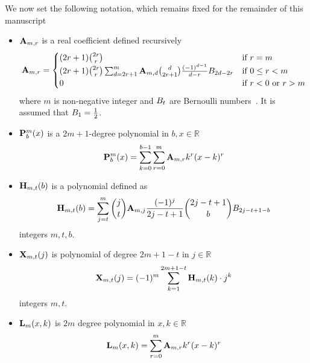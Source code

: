 We now set the following notation, which remains fixed for the remainder of this manuscript
\begin{itemize}
    \setlength\itemsep{1.6em}
    \item ${\mathbf{A}} \sb{m,r}$ is a real coefficient defined recursively
    \begin{equation}
        \label{eq:def_coeff_a}
        {\mathbf{A}} \sb{m,r} =
        \begin{cases}
        (2r+1)
            \binom{2r}{r} & \text{if } r=m \\
            (2r+1) \binom{2r}{r} \sum_{d=2r+1}^{m} {\mathbf{A}} \sb{m,d} \binom{d}{2r+1} \frac{(-1)^{d-1}}{d-r}
            {B}\sb{2d-2r} & \text{if } 0 \leq r<m \\
            0 & \text{if } r<0 \text{ or } r>m
        \end{cases}
    \end{equation}
    where $m$ is non-negative integer and ${B}\sb{t}$ are Bernoulli numbers~\cite{WeissteinBernoulli}.
    It is assumed that ${B}\sb{1}=\frac{1}{2}$.

    \item ${\mathbf{P}}\sp{m} \sb{b}(x)$ is a $2m+1$-degree polynomial in $b,x\in\mathbb{R}$
    \begin{equation}
        \label{eq:def_polynomial_p}
        {\mathbf{P}}\sp{m} \sb{b}(x) = \sum_{k=0}^{b-1} \sum_{r=0}^{m} {\mathbf{A}} \sb{m,r} k^r(x-k)^r
    \end{equation}

    \item ${\mathbf{H}} \sb{m,t} (b)$ is a polynomial defined as
    \begin{equation}
        \label{eq:def_coeff_h}
        {\mathbf{H}} \sb{m,t} (b)
        = \sum_{j=t}^{m} \binom{j}{t} {\mathbf{A}} \sb{m,j} \frac{(-1)^j}{2j-t+1} \binom{2j-t+1}{b} {B}\sb{2j-t+1-b}
    \end{equation}
    integers $m,t,b$.

    \item ${\mathbf{X}}\sb{m,t} (j)$ is polynomial of degree $2m+1-t$ in $j\in\mathbb{R}$
    \begin{equation}
        \label{eq:def_coeff_x}
        {\mathbf{X}}\sb{m,t} (j) = (-1)^m \sum_{k=1}^{2m+1-t} {\mathbf{H}} \sb{m,t} (k) \cdot j^k
    \end{equation}
    integers $m,t$.

    \item ${\mathbf{L}}\sb{m}(x,k)$ is $2m$ degree polynomial in $x,k\in\mathbb{R}$
    \begin{equation}
        \label{eq:def_polynomial_l}
        {\mathbf{L}}\sb{m}(x,k) = \sum_{r=0}^{m} {\mathbf{A}} \sb{m,r} k^r(x-k)^r
    \end{equation}


\end{itemize}
